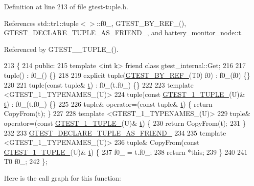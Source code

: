 Definition at line 213 of file gtest-\/tuple.\+h.



References std\+::tr1\+::tuple$<$$>$\+::f0\+\_\+, G\+T\+E\+S\+T\+\_\+\+B\+Y\+\_\+\+R\+E\+F\+\_\+(), G\+T\+E\+S\+T\+\_\+\+D\+E\+C\+L\+A\+R\+E\+\_\+\+T\+U\+P\+L\+E\+\_\+\+A\+S\+\_\+\+F\+R\+I\+E\+N\+D\+\_\+, and battery\+\_\+monitor\+\_\+node\+::t.



Referenced by G\+T\+E\+S\+T\+\_\+\_\+\+T\+U\+P\+L\+E\+\_\+().


\begin{DoxyCode}
213                         \{
214  \textcolor{keyword}{public}:
215   \textcolor{keyword}{template} <\textcolor{keywordtype}{int} k> \textcolor{keyword}{friend} \textcolor{keyword}{class }gtest\_internal::Get;
216 
217   tuple() : f0\_() \{\}
218 
219   \textcolor{keyword}{explicit} tuple(\hyperlink{gtest-tuple_8h_adcf9057737a411d833fac0382c13a181}{GTEST\_BY\_REF\_}(T0) f0) : f0\_(f0) \{\}
220 
221   tuple(\textcolor{keyword}{const} tuple& \hyperlink{namespacebattery__monitor__node_a7a63d20d1ea461e280f4eb5b47f925cd}{t}) : f0\_(t.f0\_) \{\}
222 
223   \textcolor{keyword}{template} <GTEST\_1\_TYPENAMES\_(U)>
224   tuple(\textcolor{keyword}{const} \hyperlink{gtest-tuple_8h_a544374090885c4127adc2c618570323c}{GTEST\_1\_TUPLE\_}(U)& \hyperlink{namespacebattery__monitor__node_a7a63d20d1ea461e280f4eb5b47f925cd}{t}) : f0\_(t.f0\_) \{\}
225 
226   tuple& operator=(\textcolor{keyword}{const} tuple& \hyperlink{namespacebattery__monitor__node_a7a63d20d1ea461e280f4eb5b47f925cd}{t}) \{ \textcolor{keywordflow}{return} CopyFrom(t); \}
227 
228   \textcolor{keyword}{template} <GTEST\_1\_TYPENAMES\_(U)>
229   tuple& operator=(\textcolor{keyword}{const} \hyperlink{gtest-tuple_8h_a544374090885c4127adc2c618570323c}{GTEST\_1\_TUPLE\_}(U)& \hyperlink{namespacebattery__monitor__node_a7a63d20d1ea461e280f4eb5b47f925cd}{t}) \{
230     \textcolor{keywordflow}{return} CopyFrom(t);
231   \}
232 
233   \hyperlink{gtest-tuple_8h_a2b20671273f514a88a6e9b8328e5f257}{GTEST\_DECLARE\_TUPLE\_AS\_FRIEND\_}
234 
235   \textcolor{keyword}{template} <GTEST\_1\_TYPENAMES\_(U)>
236   tuple& CopyFrom(\textcolor{keyword}{const} \hyperlink{gtest-tuple_8h_a544374090885c4127adc2c618570323c}{GTEST\_1\_TUPLE\_}(U)& \hyperlink{namespacebattery__monitor__node_a7a63d20d1ea461e280f4eb5b47f925cd}{t}) \{
237     f0\_ = t.f0\_;
238     \textcolor{keywordflow}{return} *\textcolor{keyword}{this};
239   \}
240 
241   T0 f0\_;
242 \};
\end{DoxyCode}
Here is the call graph for this function\+:
